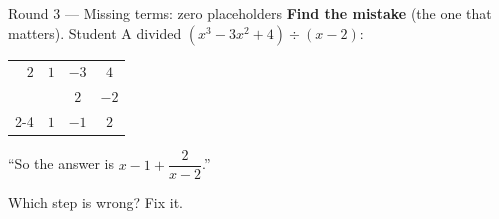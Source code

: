 \documentclass[12pt]{article}
\begin{document}
\begin{notesbox}{Round 3 --- Missing terms: zero placeholders}
\vspace{2pt}
\textbf{Find the mistake} (the one that matters). Student A divided $(x^3 - 3x^2 + 4) \div (x - 2)$:
\begin{center}
\renewcommand{\arraystretch}{1.3}
\begin{tabular}{r|ccc}
  $2$ & $1$ & $-3$ & $4$ \\
      &     & $2$ & $-2$ \\ \cline{2-4}
      & $1$ & $-1$ & $2$
\end{tabular}
\qquad
\begin{minipage}{0.5\linewidth}
``So the answer is $x - 1 + \dfrac{2}{x-2}$.''
\end{minipage}
\end{center}
Which step is wrong? Fix it.
\end{notesbox}
\end{document}
